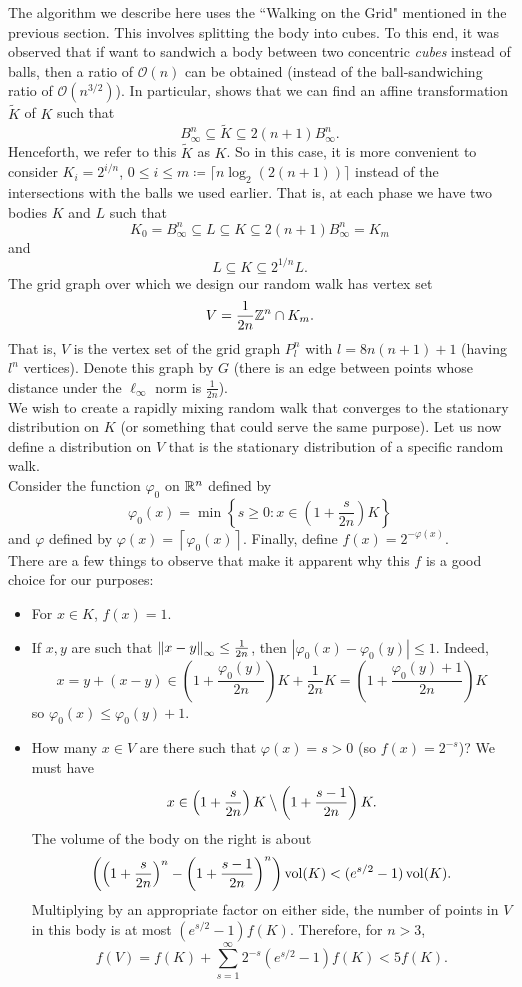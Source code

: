 The algorithm we describe here uses the ``Walking on the Grid" mentioned in the previous section. This involves splitting the body into cubes. To this end, it was observed that if want to sandwich a body between two concentric \textit{cubes} instead of balls, then a ratio of $\mathcal{O}(n)$ can be obtained (instead of the ball-sandwiching ratio of $\mathcal{O}(n^{3/2})$). In particular, \cite{applegate-kannan-cube-sandwich} shows that we can find an affine transformation $\tilde K$ of $K$ such that
\[ B_\infty^n\subseteq \tilde{K}\subseteq 2(n+1)B_\infty^n. \]
Henceforth, we refer to this $\tilde{K}$ as $K$. So in this case, it is more convenient to consider $K_i=2^{i/n}$, $0\leq i\leq m\coloneqq \lceil n\log_2(2(n+1))\rceil$ instead of the intersections with the balls we used earlier. That is, at each phase we have two bodies $K$ and $L$ such that
\[ K_0 = B_\infty^n \subseteq L \subseteq K \subseteq 2(n+1) B_\infty^n = K_m \]
and
\[ L\subseteq K\subseteq 2^{1/n}L. \]
The grid graph over which we design our random walk has vertex set
\[ V = \frac{1}{2n}\mathbb{Z}^n \cap K_m.  \]
That is, $V$ is the vertex set of the grid graph $P_l^n$ with $l=8n(n+1)+1$ (having $l^n$ vertices). Denote this graph by $G$ (there is an edge between points whose distance under the $\ell_\infty$ norm is $\frac{1}{2n}$).\\
We wish to create a rapidly mixing random walk that converges to the stationary distribution on $K$ (or something that could serve the same purpose). Let us now define a distribution on $V$ that is the stationary distribution of a specific random walk.\\
Consider the function $\varphi_0$ on $\mathbb{R}^n$ defined by
\[ \varphi_0(x) = \min\left\{s\geq 0 : x \in \left(1+\frac{s}{2n}\right)K\right\} \]
and $\varphi$ defined by $\varphi(x)=\left\lceil \varphi_0(x)\right\rceil$. Finally, define $f(x)=2^{-\varphi(x)}$.\\
There are a few things to observe that make it apparent why this $f$ is a good choice for our purposes:
\begin{itemize}
    \item For $x\in K$, $f(x)=1$.
    \item If $x,y$ are such that $\left\lVert x-y\right\rVert_\infty \leq \frac{1}{2n}$, then $|\varphi_0(x)-\varphi_0(y)|\leq 1$. Indeed,
    \[ x = y + (x-y) \in \left(1+\frac{\varphi_0(y)}{2n}\right)K + \frac{1}{2n}K = \left(1+\frac{\varphi_0(y)+1}{2n}\right)K \]
    so $\varphi_0(x) \leq \varphi_0(y)+1$.
    \item How many $x\in V$ are there such that $\varphi(x)=s>0$ (so $f(x)=2^{-s}$)? We must have
    \[ x \in \left(1+\frac{s}{2n}\right)K \mathbin{\big\backslash} \left(1+\frac{s-1}{2n}\right)K. \]
    The volume of the body on the right is about
    \[ \left(\left(1+\frac{s}{2n}\right)^n - \left(1+\frac{s-1}{2n}\right)^n\right) \operatorname{vol}(K) < (e^{s/2}-1) \operatorname{vol}(K). \]
    Multiplying by an appropriate factor on either side, the number of points in $V$ in this body is at most $(e^{s/2}-1)f(K)$. Therefore, for $n>3$,
    \[ f(V) = f(K) + \sum_{s=1}^\infty 2^{-s}(e^{s/2}-1)f(K) < 5f(K). \]
\end{itemize}
